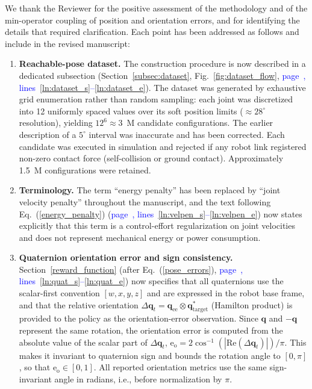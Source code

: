 \documentclass[11pt]{elsarticle}
\newcommand{\mlines}[2]{\textcolor{blue}{page~\pageref{#1}, lines~\ref{#1}--\ref{#2}}}
\begin{document}
\begin{responsebox}
We thank the Reviewer for the positive assessment of the methodology and of the min-operator coupling of position and orientation errors, and for identifying the details that required clarification. Each point has been addressed as follows and include in the revised manuscript:

\begin{enumerate}
  \item \textbf{Reachable-pose dataset.} The construction procedure is now described in a dedicated subsection (Section~\ref{subsec:dataset}, Fig.~\ref{fig:dataset_flow}, \mlines{ln:dataset_s}{ln:dataset_e}). The dataset was generated by exhaustive grid enumeration rather than random sampling: each joint was discretized into 12 uniformly spaced values over its soft position limits (${\approx}28^{\circ}$ resolution), yielding $12^{6} \approx 3$~M candidate configurations. The earlier description of a $5^{\circ}$ interval was inaccurate and has been corrected. Each candidate was executed in simulation and rejected if any robot link registered non-zero contact force (self-collision or ground contact). Approximately 1.5~M configurations were retained.

  \item \textbf{Terminology.} The term ``energy penalty'' has been replaced by ``joint velocity penalty'' throughout the manuscript, and the text following Eq.~(\ref{energy_penalty}) (\mlines{ln:velpen_s}{ln:velpen_e}) now states explicitly that this term is a control-effort regularization on joint velocities and does not represent mechanical energy or power consumption.

  \item \textbf{Quaternion orientation error and sign consistency.} Section~\ref{reward_function} (after Eq.~(\ref{pose_errors}), \mlines{ln:quat_s}{ln:quat_e}) now specifies that all quaternions use the scalar-first convention $[w,x,y,z]$ and are expressed in the robot base frame, and that the relative orientation $\Delta\mathbf{q}_t = \mathbf{q}_\text{ee} \otimes \mathbf{q}_\text{target}^{*}$ (Hamilton product) is provided to the policy as the orientation-error observation. Since $\mathbf{q}$ and $-\mathbf{q}$ represent the same rotation, the orientation error is computed from the absolute value of the scalar part of $\Delta\mathbf{q}_t$, $\text{e}_\text{o} = 2\cos^{-1}(|\text{Re}(\Delta\mathbf{q}_t)|)/\pi$. This makes it invariant to quaternion sign and bounds the rotation angle to $[0,\pi]$, so that $\text{e}_\text{o} \in [0,1]$. All reported orientation metrics use the same sign-invariant angle in radians, i.e., before normalization by $\pi$.


\end{enumerate}
\end{responsebox}
\end{document}
